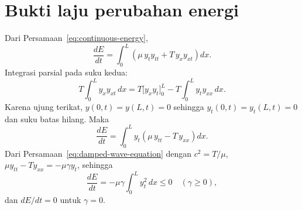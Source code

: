 \documentclass[aps,prl,twocolumn,superscriptaddress]{revtex4-2}
\begin{document}
\section{Bukti laju perubahan energi}
\label{app:energy}

Dari Persamaan~\eqref{eq:continuous-energy},
\begin{equation}
    \frac{dE}{dt}=\int_0^L\left(\mu\,y_ty_{tt}+T\,y_xy_{xt}\right)dx.
\end{equation}
Integrasi parsial pada suku kedua:
\begin{equation}
    T\int_0^Ly_xy_{xt}\,dx=T\Big[y_xy_t\Big]_0^L-T\int_0^Ly_ty_{xx}\,dx.
\end{equation}
Karena ujung terikat, $y(0,t)=y(L,t)=0$ sehingga $y_t(0,t)=y_t(L,t)=0$ dan suku batas hilang. 
Maka
\begin{equation}
    \frac{dE}{dt}=\int_0^Ly_t\left(\mu\,y_{tt}-T\,y_{xx}\right)dx.
\end{equation}
Dari Persamaan~\eqref{eq:damped-wave-equation} dengan $c^2=T/\mu$, $\mu y_{tt}-Ty_{xx}=-\mu\gamma y_t$, sehingga
\begin{equation}
    \frac{dE}{dt}=-\mu\gamma\int_0^Ly_t^2\,dx\leq0\quad(\gamma\geq0),
\end{equation}
dan $dE/dt=0$ untuk $\gamma=0$.
\end{document}
